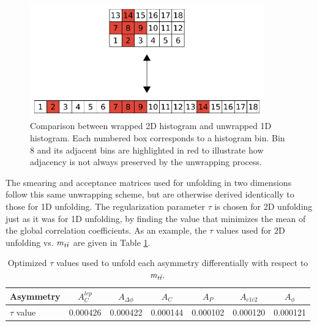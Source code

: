 \begin{figure}[htb]
\centering
\includegraphics[width=0.9\textwidth]{figures/unwrapping.pdf}
\caption{Comparison between wrapped 2D histogram and unwrapped 1D
  histogram. Each numbered box corresponds to a histogram bin. Bin
  8 and its adjacent bins are highlighted in red to illustrate how
  adjacency is not always preserved by the unwrapping process.}
\label{fig:afb:unwrapping}
\end{figure}

The smearing and acceptance matrices used for unfolding in two
dimensions follow this same unwrapping scheme, but are otherwise
derived identically to those for 1D unfolding.
The regularization parameter $\tau$ is chosen for 2D unfolding just as
it was for 1D unfolding, by finding the value that minimizes the mean
of the global correlation coefficients. As an example, the $\tau$
values used for 2D unfolding vs. $m_{t\bar{t}}$ are given in Table
\ref{tab:afb:tau2d}.

\begin{table}[htbp]
\begin{center}
\caption{Optimized $\tau$ values used to unfold each asymmetry
  differentially with respect to $m_{t\bar{t}}.$}
\label{tab:afb:tau2d}
\begin{tabular}{l | c  c  c  c  c  c }
\hline
Asymmetry & $A^{lep}_{C}$ & $A_{\Delta\phi}$ & $A_{C}$ & $A_{P}$ & $A_{c1c2}$ & $A_{\phi}$ \\ \hline
$\tau$ value & 0.000426 & 0.000422 & 0.000144 & 0.000102 & 0.000120 & 0.000121 \\ \hline
\end{tabular}
\end{center}
\end{table}

